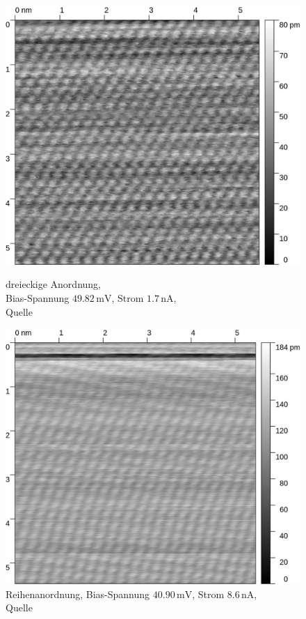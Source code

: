 \documentclass[12pt,a4paper]{scrartcl}
\numberwithin{equation}{section} %
\begin{document}
\begin{figure}[h!]
	\begin{minipage}[t]{0.5\textwidth}
		\includegraphics[width=\linewidth]{../media/B2.5/Atoms_1.jpg}
		\caption{dreieckige Anordnung, \\
			Bias-Spannung $49.82\mathrm{\,mV}$, Strom $1.7\mathrm{\,nA}$,
			\\Quelle \cite{Grover}}
		\label{fig:hopg_1}
	\end{minipage}
	\begin{minipage}[t]{0.5\textwidth}
		\includegraphics[width=\linewidth]{../media/B2.5/Atoms_2.jpg}
		\caption{Reihenanordnung,
			Bias-Spannung $40.90\mathrm{\,mV}$, Strom $8.6\mathrm{\,nA}$,
			\\Quelle \cite{Grover}}
		\label{fig:hopg_2}
	\end{minipage}
\end{figure}
\end{document}
